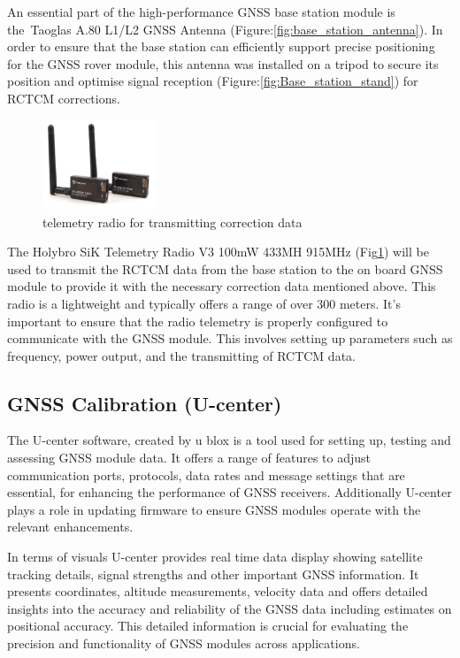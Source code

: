 \documentclass{report}
\begin{document}
An essential part of the high-performance GNSS base station module is
the Taoglas A.80 L1/L2 GNSS Antenna (Figure:\ref{fig:base_station_antenna}). In
order to ensure that the base station can efficiently support precise
positioning for the GNSS rover module, this antenna was installed on a tripod to
secure its position and optimise signal reception
(Figure:\ref{fig:Base_station_stand}) for RCTCM corrections. 

\begin{figure}[H]
  \centering
  \includegraphics[width=0.3\textwidth]{Pictures/telemetry radio.png}
  \caption{telemetry radio for transmitting correction data}
  \label{fig:telemetry_radio}
\end{figure}
The Holybro SiK Telemetry Radio V3 100mW 433MH 915MHz
(Fig\ref{fig:telemetry_radio}) will be used to transmit the RCTCM data from the
base station to the on board GNSS module to provide it with the necessary
correction data mentioned above. This radio is a lightweight and typically
offers a range of over 300 meters. It's important to ensure that the radio
telemetry is properly configured to communicate with the GNSS module. This
involves setting up parameters such as frequency, power output, and the
transmitting of RCTCM data.

\subsection{GNSS Calibration (U-center)}
The U-center software, created by u blox is a tool used for setting up, testing
and assessing GNSS module data. It offers a range of features to adjust
communication ports, protocols, data rates and message settings that are
essential, for enhancing the performance of GNSS receivers. Additionally
U-center plays a role in updating firmware to ensure GNSS modules operate with
the relevant enhancements.

In terms of visuals U-center provides real time data display showing satellite
tracking details, signal strengths and other important GNSS information. It
presents coordinates, altitude measurements, velocity data and offers detailed
insights into the accuracy and reliability of the GNSS data including estimates
on positional accuracy. This detailed information is crucial for evaluating the
precision and functionality of GNSS modules across applications.
\end{document}
